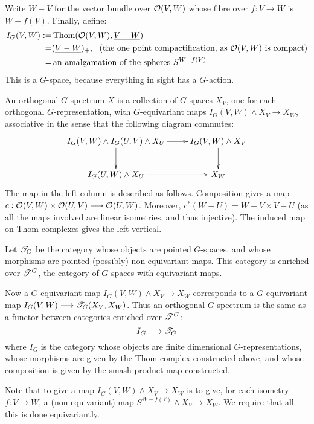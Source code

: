 \documentclass[11pt]{article}
\begin{document}
\begin{FirstNineLectures}
Write $\underline{W-V}$ for the vector bundle over $\mathcal{O}(V,W)$ whose fibre over $f:V\to W$ is $W-f(V)$. Finally, define:
\begin{alignat*}{2}
I_G(V,W):=&\textup{\,Thom}(\mathcal{O}(V,W),\underline{V-W})\\
=&(\underline{V-W})_+,\text{ \ (the one point compactification, as $\mathcal{O}(V,W)$ is compact)}\\
=&\text{\,an amalgamation of the spheres $S^{W-f(V)}$}
\end{alignat*}
This is a $G$-space, because everything in sight has a $G$-action.
\begin{defn*}
An orthogonal $G$-spectrum $X$ is a collection of $G$-spaces $X_V$, one for each orthogonal $G$-representation, with $G$-equivariant maps $I_G(V,W)\wedge X_V\to X_W$, associative in the sense that the following diagram commutes:
\[\xymatrix{
\ar[d]I_G(V,W)\wedge I_G(U,V)\wedge X_U\ar[r]&I_G(V,W)\wedge X_{V}\ar[d]\\
I_G(U,W)\wedge X_U\ar[r]&X_{W}
}\]
The map in the left column is described as follows. Composition gives a map $c:\mathcal{O}(V,W)\times\mathcal{O}(U,V)\longrightarrow\mathcal{O}(U,W)$. Moreover, $c^*(\underline{W-U})=\underline{W-V}\times\underline{V-U}$ (as all the maps involved are linear isometries, and thus injective). The induced map on Thom complexes gives the left vertical.
\end{defn*}

Let $\mathscr{T}_G$ be the category whose objects are pointed $G$-spaces, and whose morphisms are pointed (possibly) non-equivariant maps. This category is enriched over $\mathscr{T}^G$, the category of $G$-spaces with equivariant maps.

Now a $G$-equivariant map $I_G(V,W)\wedge X_V\to X_W$ corresponds to a $G$-equivariant map $I_G(V,W)\longrightarrow \mathscr{T}_G(X_V,X_W)$. Thus an orthogonal $G$-spectrum is the same as a functor between categories enriched over $\mathscr{T}^G$:
\[I_G\longrightarrow\mathscr{T}_G\]
where $I_G$ is the category whose objects are finite dimensional $G$-representations, whose morphisms are given by the Thom complex constructed above, and whose composition is given by the smash product map constructed.

Note that to give a map $I_G(V,W)\wedge X_V\to X_W$ is to give, for each isometry $f:V\to W$, a (non-equivariant) map $S^{W-f(V)}\wedge X_V\to X_W$. We require that all this is done equivariantly.


\end{FirstNineLectures}
\end{document}
